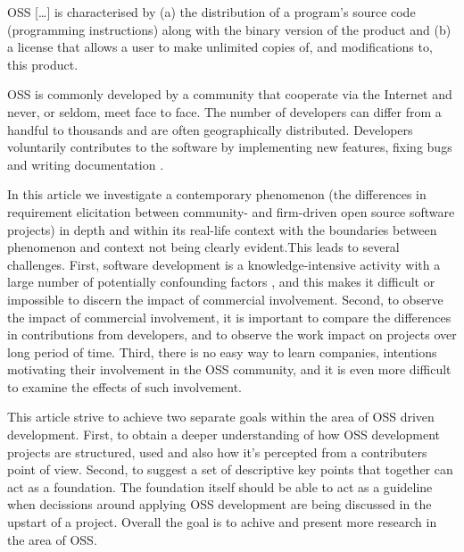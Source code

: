 \documentclass[a4paper,11pt]{article}
\begin{document}
{%
\begin{displayquote}
OSS [\dots] is characterised by (a) the distribution of a program's source code (programming instructions) along with the binary version of the product and (b) a license that allows a user to make unlimited copies of, and modifications to, this product. \cite{DiBonaChrisandOckman1999, Maccormack2006}
\end{displayquote}
OSS is commonly developed by a community that cooperate via the Internet and never, or seldom, meet face to face. The number of developers can differ from a handful to thousands and are often geographically distributed. Developers voluntarily contributes to the software by implementing new features, fixing bugs and writing documentation \cite{Maccormack2006}.

In this article we investigate a contemporary phenomenon (the differences in requirement elicitation between community- and firm-driven open source software projects) in depth and within its real-life context with the boundaries between phenomenon and context not being clearly evident\cite{RobertK1994}.This leads to several challenges. First, software development is a knowledge-intensive activity with a large number of potentially confounding factors \cite{Curtis1986}, and this makes it difficult or impossible to discern the impact of commercial involvement. Second, to observe the impact of commercial involvement, it is important to compare the differences in contributions from developers, and to observe the work impact on projects over long period of time. Third, there is no easy way to learn companies, intentions motivating their involvement in the OSS community, and it is even more difficult to examine the effects of such involvement. 


This article strive to achieve two separate goals within the area of OSS driven development. First, to obtain a deeper understanding of how OSS development projects are structured, used and also how it's percepted from a contributers point of view. Second, to suggest a set of descriptive key points that together can act as a foundation. The foundation itself should be able to act as a guideline when decissions around applying OSS development are being discussed in the upstart of a project. Overall the goal is to achive and present more research in the area of OSS.

}
\end{document}
